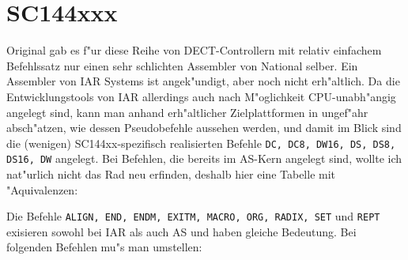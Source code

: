 \documentclass[12pt,a4paper,twoside]{report}
\newcommand{\tty}[1]{{\tt #1}}
\begin{document}
{%

\section{SC144xxx}
\label{SC144xxspec}

Original gab es f"ur diese Reihe von DECT-Controllern mit relativ
einfachem Befehlssatz nur einen sehr schlichten Assembler von National
selber.  Ein Assembler von IAR Systems ist angek"undigt, aber noch nicht
erh"altlich.  Da die Entwicklungstools von IAR allerdings auch nach
M"oglichkeit CPU-unabh"angig angelegt sind, kann man anhand erh"altlicher
Zielplattformen in ungef"ahr absch"atzen, wie dessen Pseudobefehle
aussehen werden, und damit im Blick sind die (wenigen) SC144xx-spezifisch
realisierten Befehle {\tt DC, DC8, DW16, DS, DS8, DS16, DW} angelegt. Bei
Befehlen, die bereits im AS-Kern angelegt sind, wollte ich nat"urlich
nicht das Rad neu erfinden, deshalb hier eine Tabelle mit "Aquivalenzen:

Die Befehle \tty{ALIGN, END, ENDM, EXITM, MACRO, ORG, RADIX, SET} und
\tty{REPT} exisieren sowohl bei IAR als auch AS und haben gleiche
Bedeutung.  Bei folgenden Befehlen mu"s man umstellen:

}
\end{document}
